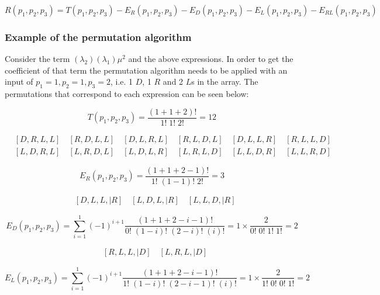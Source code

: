 \begin{equation*}
    R(p_1, p_2, p_3) = T(p_1, p_2, p_3) - E_R(p_1, p_2, p_3) - E_D(p_1, p_2, p_3) 
    - E_L(p_1, p_2, p_3) - E_{RL}(p_1, p_2, p_3)
\end{equation*}

\subsubsection{Example of the permutation algorithm}
Consider the term \((\lambda_2) (\lambda_1) \mu^2\) and the above expressions.
In order to get the coefficient of that term the permutation algorithm needs to 
be applied with an input of \(p_1=1, p_2=1, p_3=2\), i.e. 1 \(D\), 1 \(R\) and 2 
\(L\)s in the array.
The permutations that correspond to each expression can be seen below:

\begin{equation*}
    T(p_1, p_2, p_3) = \frac{(1+1+2)!}{1! \; 1! \; 2!} = 12
\end{equation*}

\begin{align*}
    & [D, R, L, L] \quad [R, D, L, L] \quad [D, L, R, L] \quad 
    [R, L, D, L] \quad [D, L, L, R] \quad [R, L, L, D] \\
    & [L, D, R, L] \quad [L, R, D, L] \quad [L, D, L, R] \quad 
    [L, R, L, D] \quad [L, L, D, R] \quad [L, L, R, D]
\end{align*}

\begin{equation*}
    E_R(p_1, p_2, p_3) = \frac{(1+1+2-1)!}{1! \; (1-1)! \; 2!} = 3
\end{equation*}

\begin{align*}
    & [D, L, L, | R] \quad [L, D, L, | R] \quad [L, L, D, | R]
\end{align*}


\begin{equation*}
    E_D(p_1, p_2, p_3) = \sum_{i=1}^{1} (-1)^{i+1} \frac{(1+1+2-i-1)!}{0! \; 
    (1-i)! \; (2-i)! \; (i)!} = 1 \times \frac{2}{0! \; 0! \; 1! \; 1!} = 2
\end{equation*}

\begin{align*}
    & [R, L, L, | D] \quad [L, R, L, | D] 
\end{align*}


\begin{equation*}
    E_L(p_1, p_2, p_3) = \sum_{i=1}^{1} (-1)^{i+1} 
    \frac{(1+1+2-i-1)!}{1! \; (1-i)! \; (2-i-1)! \; (i)!} 
    = 1 \times \frac{2}{1! \; 0! \; 0! \; 1!} = 2
\end{equation*}

